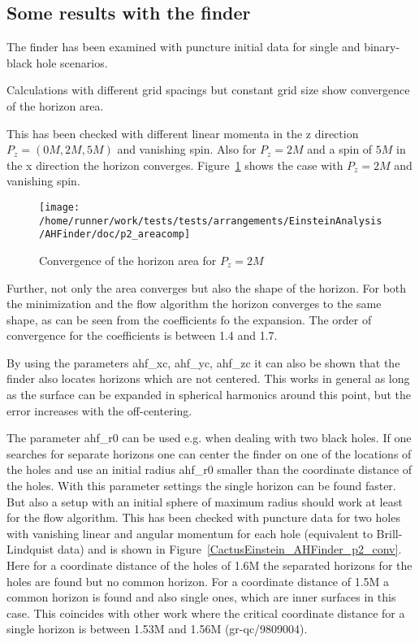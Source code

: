 \subsection{Some results with the finder}
The finder has been examined with puncture initial data for single and
binary-black hole scenarios.

Calculations with different grid spacings but constant grid size show
convergence of the horizon area.

This has been checked with different linear momenta in the z direction
$P_{z}=(0M,2M,5M)$ and vanishing spin. Also for $P_{z}=2M$ and a spin of $5M$
in the x direction the horizon converges. 
Figure~\ref{CactusEistein_AHFinder_p2_conv} shows the case with
$P_{z}=2M$ and vanishing spin.

\begin{figure}[ht]
\begin{center}
\texttt{[image: /home/runner/work/tests/tests/arrangements/EinsteinAnalysis/AHFinder/doc/p2\_areacomp]}
\end{center}
\caption{Convergence of the horizon area for $P_{z}=2M$}
\label{CactusEistein_AHFinder_p2_conv}
\end{figure}

Further, not only the area converges but also the shape of the horizon.
For both the minimization and the flow algorithm the horizon converges to
the same shape, as can be seen from the coefficients fo the expansion.
The order of convergence for the coefficients is between 1.4 and 1.7.

By using the parameters ahf\_xc, ahf\_yc, ahf\_zc it can also be shown that
the finder also locates horizons which are not centered. This works in
general as long as the surface can be expanded in spherical harmonics
around this point, but the error increases with the off-centering.

The parameter ahf\_r0 can be used e.g. when dealing with two black holes.
If one searches for separate horizons one can center the finder on one of
the locations of the holes and use an initial radius ahf\_r0 smaller than
the coordinate distance of the holes. With this parameter settings the
single horizon can be found faster. But also a setup with an initial
sphere of maximum radius should work at least for the flow algorithm.
This has been checked with puncture data for two holes with vanishing
linear and angular momentum for each hole (equivalent to Brill-Lindquist
data) and is shown in Figure~\ref{CactusEinstein_AHFinder_p2_conv}. 
Here for a coordinate distance of the holes of 1.6M the separated
horizons for the holes are found but no common horizon. For a coordinate
distance of 1.5M a common horizon is found and also single ones, which
are inner surfaces in this case. This coincides with other work where the
critical coordinate distance for a single horizon is between 1.53M and
1.56M (gr-qc/9809004).

